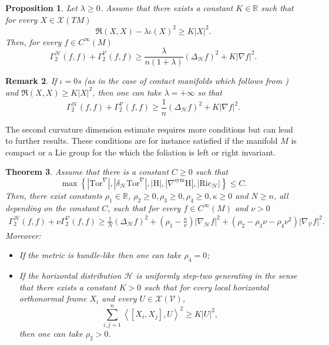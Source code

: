 \documentclass[11pt]{article}
\numberwithin{equation}{section}
\newtheorem{theorem}{Theorem}[section]
\newtheorem{proposition}[theorem]{Proposition}
\newtheorem{remark}[theorem]{Remark}
\newcommand{\Ho}{\mathcal H}
\newcommand{\V}{\mathcal V}
\newcommand{\Tor}{\mathrm{Tor}}
\begin{document}
    \begin{proposition}\label{CD with R}
        Let $\lambda \ge 0$. Assume that there exists a constant $K \in \mathbb{R}$ such that for every $X\in \mathcal{X}(TM)$
        \[
        \mathfrak{R} (X,X) -\lambda \iota (X)^2 \ge K | X|^2.
        \]
        Then, for every $f\in C^\infty (M)$
        \[
        \Gamma^\Ho_2 (f,f)+ \Gamma_2^\V (f,f) \ge \frac{\lambda}{n(1+\lambda)} (\Delta_\Ho f)^2 +K |\nabla f|^2.
        \]
    \end{proposition}
    
    \begin{remark}
        If $\iota=0$s (as in the case of contact manifolds which follows from \cite{BW14}) and $\mathfrak{R} (X,X) \ge K | X|^2$, then one can take $\lambda=+\infty$ so that
        \[
        \Gamma^\Ho_2 (f,f)+ \Gamma_2^\V (f,f) \ge \frac{1}{n} (\Delta_\Ho f)^2 +K |\nabla f|^2.
        \]
    \end{remark}
    
    The second curvature dimension estimate requires more conditions but can lead to further results. These conditions are for instance satisfied if the manifold $M$ is compact or a Lie group for the which the foliation is left or right invariant.

    \begin{theorem}\label{General CD}
Assume that there is a constant $C \ge 0 $ such that
\[
\max \left\{ | \Tor^\nabla |, | \delta_\Ho \Tor^\nabla |, | \mathrm H| , |\nabla^{\mathrm{sym}} \mathrm{H} |, | \mathrm{Ric}_\Ho| \right\} \le C.
\]
Then, there exist constants $\rho_1 \in \mathbb{R}$, $\rho_2 \ge 0,\rho_3 \ge 0,\rho_4 \ge 0,\kappa \ge 0$ and $N \ge n$, all depending on the constant $C$, such that for every $f \in C^\infty (M)$ and $\nu>0$
\begin{align}\label{generalized CD}
\Gamma^\Ho_2 (f,f)+ \nu \Gamma_2^\V (f,f) \ge \frac{1}{N}(\Delta_\Ho f)^2 +\left(\rho_1-\frac{\kappa}{\nu} \right) | \nabla_\Ho f|^2+ (\rho_2 -\rho_3 \nu -\rho_4 \nu^2) | \nabla_\V f|^2.
\end{align}
Moreover:
\begin{itemize}
\item If the metric is bundle-like then one can take $\rho_4=0$;
    \item  If the horizontal distribution $\Ho$ is uniformly step-two generating in the sense that there exists a constant $K >0$ such that for every local horizontal orthonormal frame $X_i$ and every $U \in \mathcal{X}(\V)$,
\[
\sum_{i,j=1}^n \left\langle [X_i,X_j], U \right\rangle^2 \ge K | U|^2,
\]
then one can take $\rho_2 >0$.
\end{itemize}
    \end{theorem}
\end{document}
